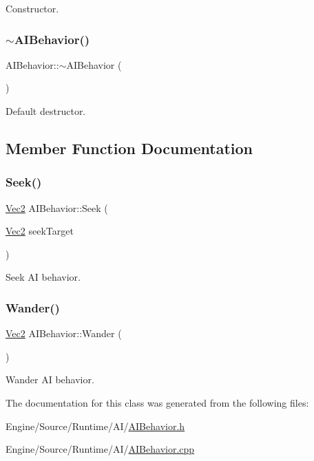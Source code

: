 Constructor. \mbox{\label{class_a_i_behavior_ae57aaaa9cb072fe0d2c510d63c0c7082}} 
\subsubsection{\texorpdfstring{$\sim$\+A\+I\+Behavior()}{~AIBehavior()}}
{\footnotesize\ttfamily A\+I\+Behavior\+::$\sim$\+A\+I\+Behavior (\begin{DoxyParamCaption}{ }\end{DoxyParamCaption})}

Default destructor. 

\subsection{Member Function Documentation}
\mbox{\label{class_a_i_behavior_aff36069dc016db7b3c174347e79063c2}} 
\subsubsection{\texorpdfstring{Seek()}{Seek()}}
{\footnotesize\ttfamily \mbox{\hyperlink{struct_vec2}{Vec2}} A\+I\+Behavior\+::\+Seek (\begin{DoxyParamCaption}\item[{\mbox{\hyperlink{struct_vec2}{Vec2}}}]{seek\+Target }\end{DoxyParamCaption})}

Seek AI behavior. \mbox{\label{class_a_i_behavior_a8f2b2c143732f4a23af75c7abbe01978}} 
\subsubsection{\texorpdfstring{Wander()}{Wander()}}
{\footnotesize\ttfamily \mbox{\hyperlink{struct_vec2}{Vec2}} A\+I\+Behavior\+::\+Wander (\begin{DoxyParamCaption}{ }\end{DoxyParamCaption})}

Wander AI behavior. 

The documentation for this class was generated from the following files\+:\begin{DoxyCompactItemize}
\item 
Engine/\+Source/\+Runtime/\+A\+I/\mbox{\hyperlink{_a_i_behavior_8h}{A\+I\+Behavior.\+h}}\item 
Engine/\+Source/\+Runtime/\+A\+I/\mbox{\hyperlink{_a_i_behavior_8cpp}{A\+I\+Behavior.\+cpp}}\end{DoxyCompactItemize}

